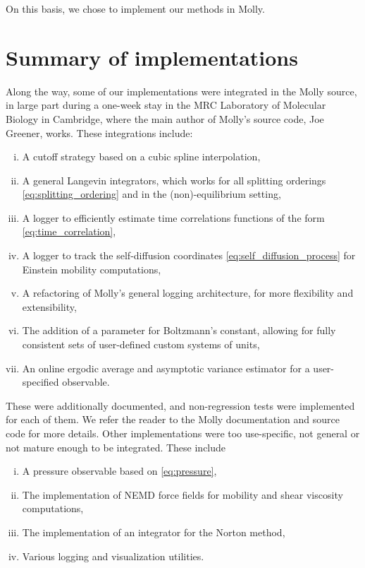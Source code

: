 On this basis, we chose to implement our methods in Molly.

\section{Summary of implementations}
Along the way, some of our implementations were integrated in the Molly source, in large part during a one-week stay in the MRC Laboratory of Molecular Biology in Cambridge, where the main author of Molly's source code, Joe Greener, works.
These integrations include:
\begin{enumerate}[i)]
    \item A cutoff strategy based on a cubic spline interpolation,
    \item A general Langevin integrators, which works for all splitting orderings \eqref{eq:splitting_ordering} and in the (non)-equilibrium setting,
    \item A logger to efficiently estimate time correlations functions of the form \eqref{eq:time_correlation},
    \item A logger to track the self-diffusion coordinates \eqref{eq:self_diffusion_process} for Einstein mobility computations,
    \item A refactoring of Molly's general logging architecture, for more flexibility and extensibility,
    \item The addition of a parameter for Boltzmann's constant, allowing for fully consistent sets of user-defined custom systems of units,
    \item An online ergodic average and asymptotic variance estimator for a user-specified observable.
\end{enumerate}
These were additionally documented, and non-regression tests were implemented for each of them. We refer the reader to the Molly documentation and source code for more details.
Other implementations were too use-specific, not general or not mature enough to be integrated. These include
\begin{enumerate}[i)]
    \item A pressure observable based on \eqref{eq:pressure},
    \item The implementation of NEMD force fields for mobility and shear viscosity computations,
    \item The implementation of an integrator for the Norton method,
    \item Various logging and visualization utilities.
\end{enumerate}
